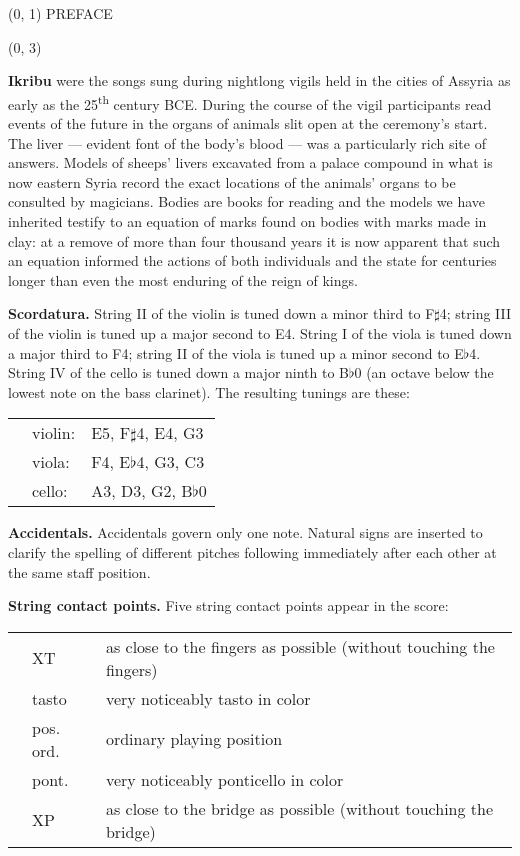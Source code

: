 \documentclass[10pt]{article}
\begin{document}
\begin{textblock}{23}(0, 1)
\center \huge PREFACE
\end{textblock}

\begin{textblock}{23}(0, 3)

\textbf{Ikribu} were the songs sung during nightlong vigils held in the cities
of Assyria as early as the 25\textsuperscript{th} century BCE. During the
course of the vigil participants read events of the future in the organs of
animals slit open at the ceremony's start. The liver --- evident font of the
body's blood --- was a particularly rich site of answers. Models of sheeps'
livers excavated from a palace compound in what is now eastern Syria record the
exact locations of the animals' organs to be consulted by magicians. Bodies are
books for reading and the models we have inherited testify to an equation of
marks found on bodies with marks made in clay: at a remove of more than four
thousand years it is now apparent that such an equation informed the actions of
both individuals and the state for centuries longer than even the most enduring
of the reign of kings.

\textbf{Scordatura.} String II of the violin is tuned down a minor third to
F$\sharp$4; string III of the violin is tuned up a major second to E4. String I
of the viola is tuned down a major third to F4; string II of the viola is tuned
up a minor second to E$\flat$4. String IV of the cello is tuned down a major
ninth to B$\flat$0 (an octave below the lowest note on the bass clarinet). The
resulting tunings are these:

\begin{tabu}{l l l}
\phantom{M} & violin: & E5, F$\sharp$4, E4, G3 \\
            & viola: & F4, E$\flat$4, G3, C3 \\
            & cello: & A3, D3, G2, B$\flat$0 \\
\end{tabu}

\textbf{Accidentals.} Accidentals govern only one note. Natural signs are
inserted to clarify the spelling of different pitches following immediately
after each other at the same staff position.

\textbf{String contact points.} Five string contact points appear in the score:

\begin{tabu}{l l l}
\phantom{M} & XT & as close to the fingers as possible (without touching the fingers) \\
            & tasto & very noticeably tasto in color\\
            & pos. ord. & ordinary playing position \\
            & pont. & very noticeably ponticello in color \\
            & XP & as close to the bridge as possible (without touching the bridge) \\
\end{tabu}


\end{textblock}
\end{document}
